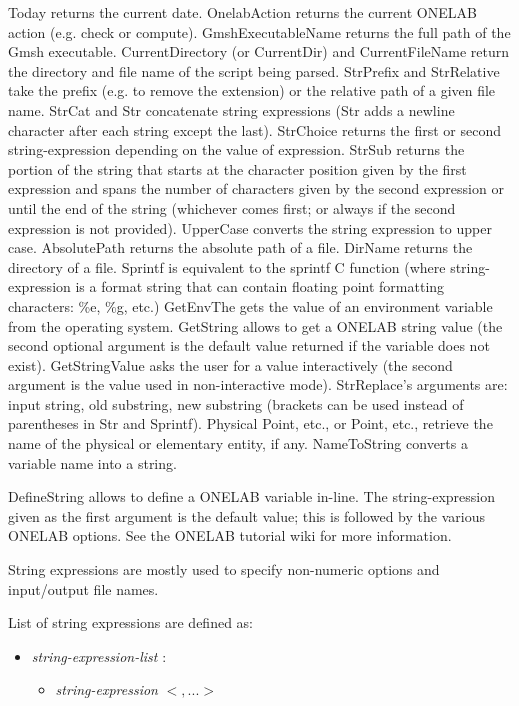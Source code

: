 \documentclass[dvipdfmx, 9pt, a4paper]{article}
\numberwithin{equation}{section}
\begin{document}
Today returns the current date. OnelabAction returns the current ONELAB action (e.g. check or compute). GmshExecutableName returns the full path of the Gmsh executable. CurrentDirectory (or CurrentDir) and CurrentFileName return the directory and file name of the script being parsed. StrPrefix and StrRelative take the prefix (e.g. to remove the extension) or the relative path of a given file name. StrCat and Str concatenate string expressions (Str adds a newline character after each string except the last). StrChoice returns the first or second string-expression depending on the value of expression. StrSub returns the portion of the string that starts at the character position given by the first expression and spans the number of characters given by the second expression or until the end of the string (whichever comes first; or always if the second expression is not provided). UpperCase converts the string expression to upper case. AbsolutePath returns the absolute path of a file. DirName returns the directory of a file. Sprintf is equivalent to the sprintf C function (where string-expression is a format string that can contain floating point formatting characters: \%e, \%g, etc.) GetEnvThe gets the value of an environment variable from the operating system. GetString allows to get a ONELAB string value (the second optional argument is the default value returned if the variable does not exist). GetStringValue asks the user for a value interactively (the second argument is the value used in non-interactive mode). StrReplace's arguments are: input string, old substring, new substring (brackets can be used instead of parentheses in Str and Sprintf). Physical Point, etc., or Point, etc., retrieve the name of the physical or elementary entity, if any. NameToString converts a variable name into a string.\par
DefineString allows to define a ONELAB variable in-line. The string-expression given as the first argument is the default value; this is followed by the various ONELAB options. See the ONELAB tutorial wiki for more information.\par
String expressions are mostly used to specify non-numeric options and input/output file names.\par
List of string expressions are defined as:
\begin{itemize}
\item {\it string-expression-list} :
\begin{itemize}
\item {\it string-expression} $<, ...>$
\end{itemize}
\end{itemize}
\end{document}
